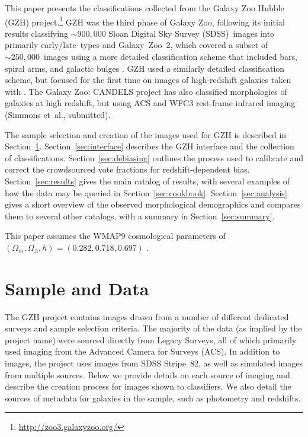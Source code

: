 \documentclass[twocolumn]{aastex6}
\begin{document}
This paper presents the classifications collected from the Galaxy Zoo Hubble
(GZH) project.\footnote{\url{http://zoo3.galaxyzoo.org/}} GZH was the third
phase of Galaxy Zoo, following its initial results classifying
$\sim900,000$ Sloan Digital Sky Survey (SDSS)~images into primarily early/late~types \citep{lin11} and
Galaxy~Zoo~2, which covered a subset of $\sim250,000$~images using a more detailed
classification scheme that included bars, spiral arms, and galactic bulges
\citep{wil13}. GZH used a similarly detailed classification scheme, but focused
for the first time on images of high-redshift galaxies taken with \hst. The
Galaxy Zoo: CANDELS project has also classified morphologies of galaxies at
high redshift, but using ACS and WFC3 rest-frame infrared imaging (Simmons
et~al., submitted).

The sample selection and creation of the images used for GZH is described in
Section~\ref{sec:data}. Section~\ref{sec:interface} describes the GZH interface
and the collection of classifications. Section~\ref{sec:debiasing} outlines the
process used to calibrate and correct the crowdsourced vote fractions for
redshift-dependent bias. Section~\ref{sec:results} gives the main catalog of
results, with several examples of how the data may be queried in
Section~\ref{sec:cookbook}. Section~\ref{sec:analysis} gives a short overview
of the observed morphological demographics and compares them to several other
catalogs, with a summary in Section~\ref{sec:summary}.

This paper assumes the WMAP9 cosmological parameters of
$(\Omega_m,\Omega_\Lambda,h)=(0.282,0.718,0.697)$ \citep{hin13}.

\section{Sample and Data}\label{sec:data}

The GZH project contains images drawn from a number of different dedicated
surveys and sample selection criteria. The majority of the data (as implied by
the project name) were sourced directly from \hst{} Legacy Surveys, all of which
primarily used imaging from the Advanced Camera for Surveys (ACS). In addition
to \hst{} images, the project uses images from SDSS Stripe~82, as well as
simulated \hst{} images from multiple sources. Below we provide details on each
source of imaging and describe the creation process for images shown to classifiers. 
We also detail the sources of metadata for galaxies in the sample, such as 
photometry and redshifts.
\end{document}
